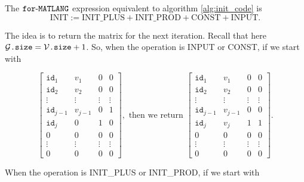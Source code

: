     The $\texttt{for}\text{-}\texttt{MATLANG}$ expression equivalent to algorithm \ref{alg:init_code} is $$\text{INIT}:=\text{INIT{\_}PLUS}+\text{INIT{\_}PROD}+\text{CONST}+\text{INPUT}.$$

    The idea is to return the matrix for the next iteration. Recall that here $\mathcal{G}\texttt{.size}=\mathcal{V}\texttt{.size} + 1$. So, when the operation is INPUT or CONST, if we start with

    \[
    \begin{bmatrix}
        \texttt{id}_1 & v_1 & 0 & 0 \\
        \texttt{id}_2 & v_2 & 0 & 0 \\
        \vdots & \vdots & \vdots & \vdots \\
        \texttt{id}_{j-1} & v_{j-1} & 0 & 1 \\
        \texttt{id}_j & 0 & 1 & 0 \\
        0 & 0 & 0 & 0 \\
        \vdots & \vdots & \vdots & \vdots \\
        0 & 0 & 0 & 0
    \end{bmatrix}, \text{ then we return }
    \begin{bmatrix}
        \texttt{id}_1 & v_1 & 0 & 0 \\
        \texttt{id}_2 & v_2 & 0 & 0 \\
        \vdots & \vdots & \vdots & \vdots \\
        \texttt{id}_{j-1} & v_{j-1} & 0 & 0 \\
        \texttt{id}_j & v_j & 1 & 1 \\
        0 & 0 & 0 & 0 \\
        \vdots & \vdots & \vdots & \vdots \\
        0 & 0 & 0 & 0
    \end{bmatrix}.
    \]

    When the operation is INIT{\_}PLUS or INIT{\_}PROD, if we start with 


